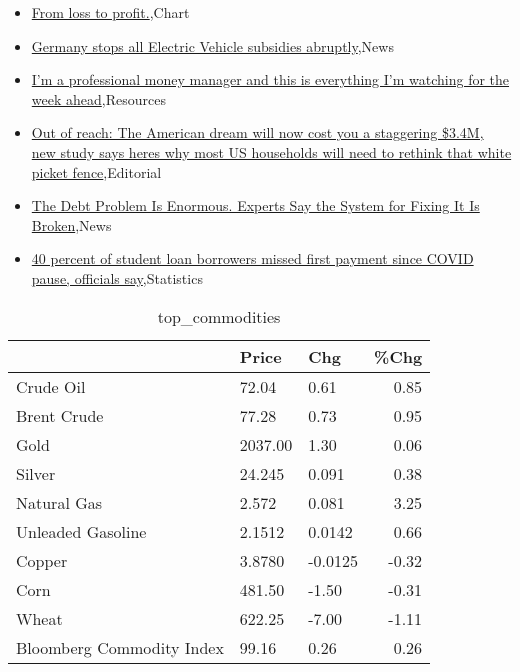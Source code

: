 \documentclass{article}%
\begin{document}
%
\begin{itemize}%
\item%
\href{https://reddit.com/r/wallstreetbets/comments/18l5ccy/from\_loss\_to\_profit/}{From loss to profit.},Chart%
\item%
\href{https://reddit.com/r/wallstreetbets/comments/18l28vd/germany\_stops\_all\_electric\_vehicle\_subsidies/}{Germany stops all Electric Vehicle subsidies abruptly},News%
\item%
\href{https://reddit.com/r/StockMarket/comments/18kx5ot/im\_a\_professional\_money\_manager\_and\_this\_is/}{I'm a professional money manager and this is everything I'm watching for the week ahead},Resources%
\item%
\href{https://reddit.com/r/Economics/comments/18kyekc/out\_of\_reach\_the\_american\_dream\_will\_now\_cost\_you/}{Out of reach: The American dream will now cost you a staggering \$3.4M, new study says  heres why most US households will need to rethink that white picket fence},Editorial%
\item%
\href{https://reddit.com/r/Economics/comments/18kxakw/the\_debt\_problem\_is\_enormous\_experts\_say\_the/}{The Debt Problem Is Enormous. Experts Say the System for Fixing It Is Broken},News%
\item%
\href{https://reddit.com/r/Economics/comments/18kujhi/40\_percent\_of\_student\_loan\_borrowers\_missed\_first/}{40 percent of student loan borrowers missed first payment since COVID pause, officials say},Statistics%
\end{itemize}%


\begin{table}[htbp]%
\caption{top\_commodities}%
\centering%
\begin{adjustbox}{width=1\textwidth}%
\begin{tabular}{lllr}
\toprule
                          &   Price &     Chg &  \%Chg \\
\midrule
               Crude Oil  &   72.04 &    0.61 &  0.85 \\
             Brent Crude  &   77.28 &    0.73 &  0.95 \\
                    Gold  & 2037.00 &    1.30 &  0.06 \\
                  Silver  &  24.245 &   0.091 &  0.38 \\
             Natural Gas  &   2.572 &   0.081 &  3.25 \\
       Unleaded Gasoline  &  2.1512 &  0.0142 &  0.66 \\
                  Copper  &  3.8780 & -0.0125 & -0.32 \\
                    Corn  &  481.50 &   -1.50 & -0.31 \\
                   Wheat  &  622.25 &   -7.00 & -1.11 \\
Bloomberg Commodity Index &   99.16 &    0.26 &  0.26 \\
\bottomrule
\end{tabular}
%
\end{adjustbox}%
\end{table}
\end{document}
